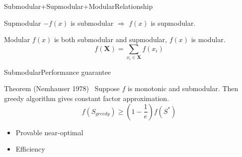 \begin{frame}{Submodular+Supmodular+Modular}{Relationship}
\begin{block}{Supmodular}
$ - f(x) $ is submodular $ \Rightarrow $ $ f(x) $ is supmodular.
\end{block}
\begin{block}{Modular}
$ f(x) $ is both submodular and supmodular, $ f(x) $ is modular.
\begin{equation}
\nonumber
f( \mathbf{X} ) = \sum_{ x_{i} \in \mathbf{X} } f(x_{i})
\end{equation}
\end{block}
\end{frame}

\begin{frame}{Submodular}{Performance guarantee}
\begin{block}{Theorem (Nemhauser 1978)~\cite{nemhauser1978}}
Suppose $ f $ is monotonic and submodular. 
Then greedy algorithm gives constant factor approximation.
\begin{equation}
\nonumber
f(S_{greedy}) \geq (1 - \frac{1}{e}) f(S^{*})
\end{equation}	
\end{block}
\begin{itemize}
\item Provable near-optimal
\item Efficiency
\end{itemize}
\end{frame}